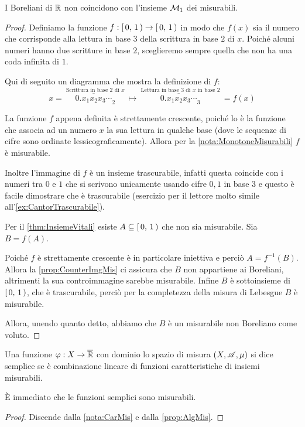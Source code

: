 \begin{proposition}\label{prop:BorelianiNonMisurabili2}
	I Boreliani di $\mathbb R$ non coincidono con l'insieme $\mathcal M_1$ dei misurabili.
\end{proposition}
\begin{proof}
	Definiamo la funzione $f:\left[\,0,\,1\,\right)\to \left[\,0,\,1\,\right)$ in modo che $f(x)$ sia il numero che corrisponde alla lettura in base $3$ della scrittura in base $2$ di $x$.
	Poiché alcuni numeri hanno due scritture in base $2$, sceglieremo sempre quella che non ha una coda infinita di $1$.
	
	Qui di seguito un diagramma che mostra la definizione di $f$:
	\begin{equation*}
		x=\>\stackrel{\text{Scrittura in base $2$ di $x$}}{\overline{0.x_1x_2x_3\cdots}_2} \>  \longmapsto
		\> \stackrel{\text{Lettura in base $3$ di $x$ in base $2$}}{\overline{0.x_1x_2x_3\cdots}_3}\>=f(x)
	\end{equation*}

	La funzione $f$ appena definita è strettamente crescente, poiché lo è la funzione che associa ad un numero $x$ la sua lettura in qualche base (dove le sequenze di cifre sono ordinate lessicograficamente). Allora per la \cref{nota:MonotoneMisurabili} $f$ è misurabile.
	
	Inoltre l'immagine di $f$ è un insieme trascurabile, infatti questa coincide con i numeri tra $0$ e $1$ che si scrivono unicamente usando cifre $0,1$ in base $3$ e questo è facile dimostrare che è trascurabile (esercizio per il lettore molto simile all'\cref{ex:CantorTrascurabile}).
	
	Per il \cref{thm:InsiemeVitali} esiste $A\subseteq \left[\,0,\,1\,\right)$ che non sia misurabile.
	Sia $B=f(A)$.
	
	Poiché $f$ è strettamente crescente è in particolare iniettiva e perciò $A=f^{-1}(B)$.
	Allora la \cref{prop:CounterImgMis} ci assicura che $B$ non appartiene ai Boreliani, altrimenti la sua controimmagine sarebbe misurabile. 
	Infine $B$ è sottoinsieme di $\left[\,0,\,1\,\right)$, che è trascurabile, perciò per la completezza della misura di Lebesgue $B$ è misurabile.
	
	Allora, unendo quanto detto, abbiamo che $B$ è un misurabile non Boreliano come voluto.
\end{proof}



\begin{definition}
	Una funzione $\varphi:X \rightarrow \overline{\mathbb R}$ con dominio lo spazio di misura $(X,\mathscr A,\mu)$ si dice semplice se è combinazione lineare di
	funzioni caratteristiche di insiemi misurabili.
\end{definition}
\begin{remark}
	È immediato che le funzioni semplici sono misurabili.
\end{remark}
\begin{proof}
	Discende dalla \cref{nota:CarMis} e dalla \cref{prop:AlgMis}.
\end{proof}


